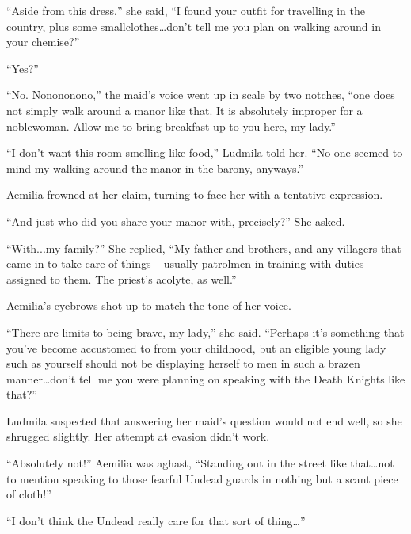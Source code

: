  

“Aside from this dress,” she said, “I found your outfit for travelling in the country, plus some smallclothes…don’t tell me you plan on walking around in your chemise?”

 

“Yes?”

 

“No. Nonononono,” the maid’s voice went up in scale by two notches, “one does not simply walk around a manor like that. It is absolutely improper for a noblewoman. Allow me to bring breakfast up to you here, my lady.”

 

“I don’t want this room smelling like food,” Ludmila told her. “No one seemed to mind my walking around the manor in the barony, anyways.”

 

Aemilia frowned at her claim, turning to face her with a tentative expression.

 

“And just who did you share your manor with, precisely?” She asked.

 

“With...my family?” She replied, “My father and brothers, and any villagers that came in to take care of things – usually patrolmen in training with duties assigned to them. The priest’s acolyte, as well.”

 

Aemilia’s eyebrows shot up to match the tone of her voice.

 

“There are limits to being brave, my lady,” she said. “Perhaps it’s something that you’ve become accustomed to from your childhood, but an eligible young lady such as yourself should not be displaying herself to men in such a brazen manner…don’t tell me you were planning on speaking with the Death Knights like that?”

 

Ludmila suspected that answering her maid’s question would not end well, so she shrugged slightly. Her attempt at evasion didn’t work.

 

“Absolutely not!” Aemilia was aghast, “Standing out in the street like that…not to mention speaking to those fearful Undead guards in nothing but a scant piece of cloth!”

 

“I don’t think the Undead really care for that sort of thing…”

